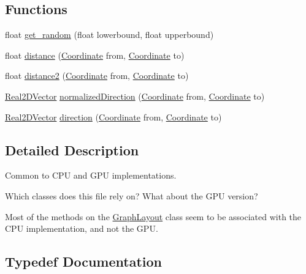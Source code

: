 \subsection*{Functions}
\begin{DoxyCompactItemize}
\item 
float \mbox{\hyperlink{namespaceRPGraph_af65dfa4ca7a18662d86db71341a4478d}{get\+\_\+random}} (float lowerbound, float upperbound)
\item 
float \mbox{\hyperlink{namespaceRPGraph_ac0ea5eed59279f669d6a944798a58d48}{distance}} (\mbox{\hyperlink{classRPGraph_1_1Coordinate}{Coordinate}} from, \mbox{\hyperlink{classRPGraph_1_1Coordinate}{Coordinate}} to)
\item 
float \mbox{\hyperlink{namespaceRPGraph_aa54d04cd9574e91651e2566eb868df1f}{distance2}} (\mbox{\hyperlink{classRPGraph_1_1Coordinate}{Coordinate}} from, \mbox{\hyperlink{classRPGraph_1_1Coordinate}{Coordinate}} to)
\item 
\mbox{\hyperlink{classRPGraph_1_1Real2DVector}{Real2\+D\+Vector}} \mbox{\hyperlink{namespaceRPGraph_ab7f99412b5c91ab02e4a74885a49e9a6}{normalized\+Direction}} (\mbox{\hyperlink{classRPGraph_1_1Coordinate}{Coordinate}} from, \mbox{\hyperlink{classRPGraph_1_1Coordinate}{Coordinate}} to)
\item 
\mbox{\hyperlink{classRPGraph_1_1Real2DVector}{Real2\+D\+Vector}} \mbox{\hyperlink{namespaceRPGraph_a18f01f18cedd3449b2bface612bde934}{direction}} (\mbox{\hyperlink{classRPGraph_1_1Coordinate}{Coordinate}} from, \mbox{\hyperlink{classRPGraph_1_1Coordinate}{Coordinate}} to)
\end{DoxyCompactItemize}


\subsection{Detailed Description}
Common to C\+PU and G\+PU implementations.

Which classes does this file rely on? What about the G\+PU version?

Most of the methods on the \mbox{\hyperlink{classRPGraph_1_1GraphLayout}{Graph\+Layout}} class seem to be associated with the C\+PU implementation, and not the G\+PU. 

\subsection{Typedef Documentation}
\mbox{\label{namespaceRPGraph_ae1c8374fd31c97d09000581a63811ee4}} 

